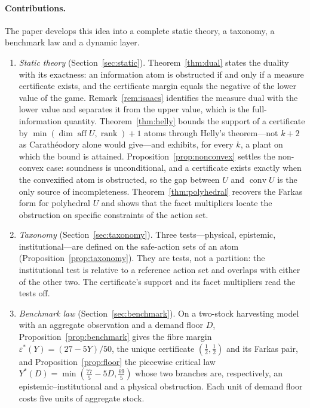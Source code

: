\documentclass[11pt,a4paper]{article}
\theoremstyle{plain}
\theoremstyle{definition}
\theoremstyle{remark}
\newcommand{\conv}{\operatorname{conv}}
\newcommand{\aff}{\operatorname{aff}}
\newcommand{\rank}{\operatorname{rank}}
\newcommand{\tfr}[2]{\tfrac{#1}{#2}}
\begin{document}
\paragraph{Contributions.} The paper develops this idea into a complete static theory, a taxonomy, a benchmark law and a dynamic layer.
\begin{enumerate}[leftmargin=1.6em,itemsep=1pt]
\item \emph{Static theory} (Section~\ref{sec:static}). Theorem~\ref{thm:dual} states the duality with its exactness: an information atom is obstructed if and only if a measure certificate exists, and the certificate margin equals the negative of the lower value of the game. Remark~\ref{rem:isaacs} identifies the measure dual with the lower value and separates it from the upper value, which is the full-information quantity. Theorem~\ref{thm:helly} bounds the support of a certificate by $\min(\dim\aff U,\rank)+1$ atoms through Helly's theorem---not $k+2$ as Carath\'eodory alone would give---and exhibits, for every $k$, a plant on which the bound is attained. Proposition~\ref{prop:nonconvex} settles the non-convex case: soundness is unconditional, and a certificate exists exactly when the convexified atom is obstructed, so the gap between $U$ and $\conv U$ is the only source of incompleteness. Theorem~\ref{thm:polyhedral} recovers the Farkas form for polyhedral $U$ and shows that the facet multipliers locate the obstruction on specific constraints of the action set.
\item \emph{Taxonomy} (Section~\ref{sec:taxonomy}). Three tests---physical, epistemic, institutional---are defined on the safe-action sets of an atom (Proposition~\ref{prop:taxonomy}). They are tests, not a partition: the institutional test is relative to a reference action set and overlaps with either of the other two. The certificate's support and its facet multipliers read the tests off.
\item \emph{Benchmark law} (Section~\ref{sec:benchmark}). On a two-stock harvesting model with an aggregate observation and a demand floor $D$, Proposition~\ref{prop:benchmark} gives the fibre margin $\varepsilon^\ast(Y)=(27-5Y)/50$, the unique certificate $(\tfr12,\tfr12)$ and its Farkas pair, and Proposition~\ref{prop:floor} the piecewise critical law $Y^\ast(D)=\min(\tfr{77}5-5D,\tfr{69}5)$ whose two branches are, respectively, an epistemic--institutional and a physical obstruction. Each unit of demand floor costs five units of aggregate stock.

\end{enumerate}
\end{document}
